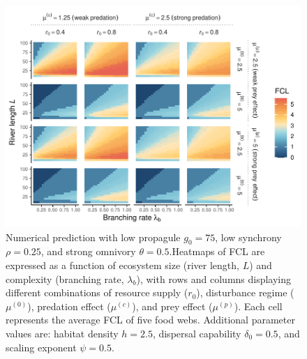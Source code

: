 \begin{figure}
\centering
\includegraphics{../data_fmt/fig_rho025_g75_theta05.pdf}
\caption{\label{fig:fig-num5}Numerical prediction with low propagule
\(g_0 = 75\), low synchrony \(\rho = 0.25\), and strong omnivory
\(\theta = 0.5\).Heatmaps of FCL are expressed as a function of
ecosystem size (river length, \(L\)) and complexity (branching rate,
\(\lambda_b\)), with rows and columns displaying different combinations
of resource supply (\(r_0\)), disturbance regime (\(\mu^{(0)}\)),
predation effect (\(\mu^{(c)}\)), and prey effect (\(\mu^{(p)}\)). Each
cell represents the average FCL of five food webs. Additional parameter
values are: habitat density \(h=2.5\), dispersal capability
\(\delta_0=0.5\), and scaling exponent \(\psi=0.5\).}
\end{figure}

\newpage

